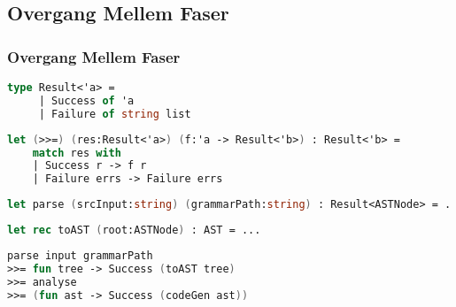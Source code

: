 \subsection{Overgang Mellem Faser}
\begin{frame}[fragile]
  \frametitle{Overgang Mellem Faser}
  \begin{lstlisting}[language=fsharp]
type Result<'a> =
     | Success of 'a
     | Failure of string list
  \end{lstlisting}

  \begin{lstlisting}[language=fsharp]
let (>>=) (res:Result<'a>) (f:'a -> Result<'b>) : Result<'b> =
    match res with
    | Success r -> f r
    | Failure errs -> Failure errs
  \end{lstlisting}

  \begin{lstlisting}[language=fsharp]
let parse (srcInput:string) (grammarPath:string) : Result<ASTNode> = ...
  \end{lstlisting}

  \begin{lstlisting}[language=fsharp]
let rec toAST (root:ASTNode) : AST = ...
  \end{lstlisting}
  
  \begin{lstlisting}[language=fsharp]
parse input grammarPath 
>>= fun tree -> Success (toAST tree)
>>= analyse
>>= (fun ast -> Success (codeGen ast))
  \end{lstlisting}

\end{frame}

